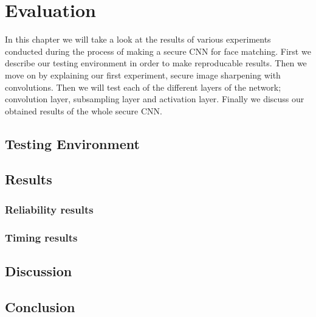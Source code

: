 \chapter{Evaluation}
\label{chapter:evaluation}

In this chapter we will take a look at the results of various experiments conducted during the process of making a secure CNN for face matching. First we describe our testing environment in order to make reproducable results. Then we move on by explaining our first experiment, secure image sharpening with convolutions. Then we will test each of the different layers of the network; convolution layer, subsampling layer and activation layer. Finally we discuss our obtained results of the whole secure CNN.

\section{Testing Environment}

\section{Results}
\subsection{Reliability results}
\subsection{Timing results}

\section{Discussion}

\section{Conclusion}
